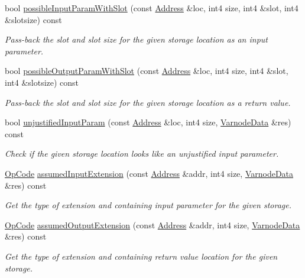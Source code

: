 \begin{DoxyCompactItemize}
bool \mbox{\hyperlink{class_proto_model_a6577cdf023ed6a660ba804e43e356b4e}{possible\+Input\+Param\+With\+Slot}} (const \mbox{\hyperlink{class_address}{Address}} \&loc, int4 size, int4 \&slot, int4 \&slotsize) const
\begin{DoxyCompactList}\small\item\em Pass-\/back the slot and slot size for the given storage location as an input parameter. \end{DoxyCompactList}\item 
bool \mbox{\hyperlink{class_proto_model_afd3283c9f718ce1e521186810f48ce6f}{possible\+Output\+Param\+With\+Slot}} (const \mbox{\hyperlink{class_address}{Address}} \&loc, int4 size, int4 \&slot, int4 \&slotsize) const
\begin{DoxyCompactList}\small\item\em Pass-\/back the slot and slot size for the given storage location as a return value. \end{DoxyCompactList}\item 
bool \mbox{\hyperlink{class_proto_model_a8c0c20931a1fe2c0d3cf4fb3f8fe7c02}{unjustified\+Input\+Param}} (const \mbox{\hyperlink{class_address}{Address}} \&loc, int4 size, \mbox{\hyperlink{struct_varnode_data}{Varnode\+Data}} \&res) const
\begin{DoxyCompactList}\small\item\em Check if the given storage location looks like an {\itshape unjustified} input parameter. \end{DoxyCompactList}\item 
\mbox{\hyperlink{opcodes_8hh_abeb7dfb0e9e2b3114e240a405d046ea7}{Op\+Code}} \mbox{\hyperlink{class_proto_model_a4fcf1b51c0ce470e353e798b9eaa8603}{assumed\+Input\+Extension}} (const \mbox{\hyperlink{class_address}{Address}} \&addr, int4 size, \mbox{\hyperlink{struct_varnode_data}{Varnode\+Data}} \&res) const
\begin{DoxyCompactList}\small\item\em Get the type of extension and containing input parameter for the given storage. \end{DoxyCompactList}\item 
\mbox{\hyperlink{opcodes_8hh_abeb7dfb0e9e2b3114e240a405d046ea7}{Op\+Code}} \mbox{\hyperlink{class_proto_model_a74ad1cd29d07b30a4525049a6b2ee270}{assumed\+Output\+Extension}} (const \mbox{\hyperlink{class_address}{Address}} \&addr, int4 size, \mbox{\hyperlink{struct_varnode_data}{Varnode\+Data}} \&res) const
\begin{DoxyCompactList}\small\item\em Get the type of extension and containing return value location for the given storage. \end{DoxyCompactList}\item 

\end{DoxyCompactItemize}
